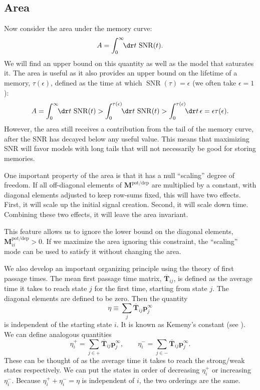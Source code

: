 \documentclass{article} %
\DeclareMathOperator{\snr}{SNR}
\newcommand{\pr}{\mathbf{p}}
\newcommand{\eq}{\pr^\infty}
\newcommand{\fpt}{\mathbf{T}}
\newcommand{\fptb}{\overline{\fpt}}
\newcommand{\M}{\mathbf{M}}
\newcommand{\potdep}{^{\text{pot/dep}}}
\begin{document}
\subsection{Area}\label{sec:area}

Now consider the area under the memory curve:
%
\begin{equation}\label{eq:area}
  A = \int_0^\infty\!\!\dr t \, \snr(t).
\end{equation}
%
We will find an upper bound on this quantity as well as the model that saturates it.
The area is useful as it also provides an upper bound on the lifetime of a memory, $\tau(\epsilon)$, defined as the time at which $\snr(\tau)=\epsilon$ (we often take $\epsilon=1$):
%
\begin{equation}\label{eq:arealife}
  A = \int_0^\infty\!\!\dr t \, \snr(t)
    > \int_0^{\tau(\epsilon)}\!\!\dr t \, \snr(t)
    > \int_0^{\tau(\epsilon)}\!\!\dr t \, \epsilon
    = \epsilon \tau(\epsilon).
\end{equation}
%
However, the area still receives a contribution from the tail of the memory curve, after the SNR has decayed below any useful value.
This means that maximizing SNR will favor models with long tails that will not necessarily be good for storing memories.

One important property of the area is that it has a null ``scaling'' degree of freedom.
If all off-diagonal elements of $\M\potdep$ are multiplied by a constant, with diagonal elements adjusted to keep row-sums fixed, this will have two effects.
First, it will scale up the initial signal creation.
Second, it will scale down time.
Combining these two effects, it will leave the area invariant.

This feature allows us to ignore the lower bound on the diagonal elements, $\M\potdep_{ii}>0$.
If we maximize the area ignoring this constraint, the ``scaling'' mode can be used to satisfy it without changing the area.

We also develop an important organizing principle using the theory of first passage times.
The mean first passage time matrix, $\fptb_{ij}$, is defined as the average time it takes to reach state $j$ for the first time, starting from state $j$.
The diagonal elements are defined to be zero.
Then the quantity
%
\begin{equation}\label{eq:kemenyconst}
  \eta \equiv \sum_j \fptb_{ij}\eq_j
\end{equation}
%
is independent of the starting state $i$.
It is known as Kemeny's constant (see \cite[\S4.4]{kemeny1960finite}).
We can define analogous quantities
%
\begin{equation}\label{eq:kemenypm}
   \eta^+_i = \sum_{j\in+} \fptb_{ij} \eq_j,
   \qquad
   \eta^-_i = \sum_{j\in-} \fptb_{ij} \eq_j.
\end{equation}
%
These can be thought of as the average time it takes to reach the strong/weak states respectively.
We can put the states in order of decreasing $\eta^+_i$ or increasing $\eta^-_i$.
Because $\eta^+_i+\eta^-_i=\eta$ is independent of $i$, the two orderings are the same.
\end{document}
